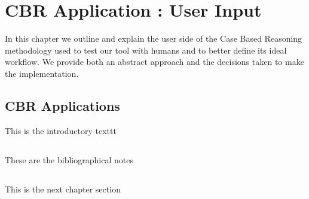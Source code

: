 %
%

\chapter{CBR Application : User Input}

\begin{resumen}
In this chapter we outline and explain the user side of the Case Based Reasoning methodology used to test our tool with humans and to better define its ideal workflow.
We provide both an abstract approach and the decisions taken to make the implementation.
\end{resumen}


\section{CBR Applications}
\label{cap1:sec:introduccion}

This is the introductory texttt

\section*{\NotasBibliograficas}
\TocNotasBibliograficas

These are the bibliographical notes
\citep{ldesc2e}

\medskip



\section*{\ProximoCapitulo}
\TocProximoCapitulo

This is the next chapter section

